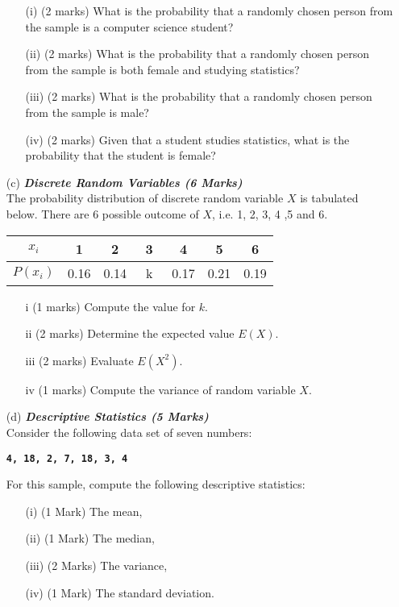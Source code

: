 \documentclass[]{article}
\begin{document}
\begin{itemize}
\begin{itemize}
\item[(i)] (2 marks) What is the probability that a randomly chosen person from the sample is a
computer science student?
\item[(ii)] (2 marks) What is the probability that a randomly chosen person from the sample is both female and studying statistics?
\item[(iii)] (2 marks) What is the probability that a randomly chosen person from the sample is male?
\item[(iv)] (2 marks) Given that a student studies statistics, what is the probability that the student is female?
\end{itemize}
\item[(c)] \textbf{\textit{Discrete Random Variables (6 Marks)}}\\The probability distribution of discrete random variable $X$ is tabulated below. There are 6 possible outcome of $X$, i.e. 1, 2, 3, 4 ,5 and 6.
\begin{center}
\begin{tabular}{|c||c|c|c|c|c|c|}
\hline
$x_i$  & 1 & 2 & 3 & 4 & 5 & 6 \\\hline
$P(x_i)$ & 0.16 & 0.14 & \mbox{   k   } & 0.17 & 0.21 & 0.19\\
\hline
\end{tabular}
\end{center}

\begin{itemize}
\item[i] (1 marks) Compute the value for $k$.
\item[ii] (2 marks) Determine the expected value $E(X)$.
\item[iii] (2 marks) Evaluate $E(X^2)$.
\item[iv] (1 marks) Compute the variance of random variable $X$.
\end{itemize}\item[(d)] \textbf{\textit{Descriptive Statistics (5 Marks)}}\\
Consider the following data set of seven numbers:

\begin{center}
\textbf{\texttt{4, 18,  2,  7, 18,  3,  4 }}
\end{center}

\noindent For this sample, compute the following descriptive statistics:
\begin{itemize}
\item[(i)] (1 Mark) The mean,
\item[(ii)] (1 Mark) The median,
\item[(iii)] (2 Marks) The variance,
\item[(iv)] (1 Mark) The standard deviation.
\end{itemize}
\end{itemize}
\end{document}
